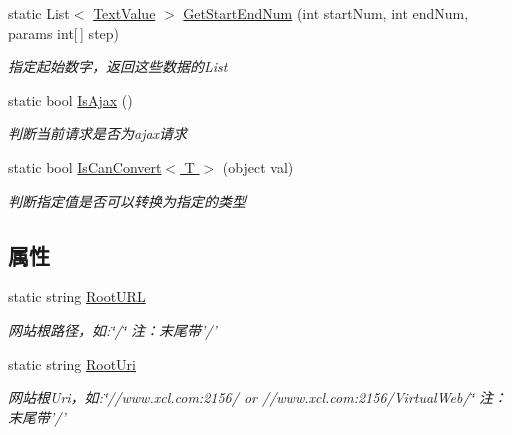 \begin{DoxyCompactItemize}
static List$<$ \hyperlink{class_x_c_l_net_tools_1_1_entity_1_1_text_value}{Text\-Value} $>$ \hyperlink{class_x_c_l_net_tools_1_1_string_hander_1_1_common_a34f200ef899d3b8ff3bff707f86c24d2}{Get\-Start\-End\-Num} (int start\-Num, int end\-Num, params int\mbox{[}$\,$\mbox{]} step)
\begin{DoxyCompactList}\small\item\em 指定起始数字，返回这些数据的\-List \end{DoxyCompactList}\item 
static bool \hyperlink{class_x_c_l_net_tools_1_1_string_hander_1_1_common_a2573b0ab4c60ce76ab6713ed40339db4}{Is\-Ajax} ()
\begin{DoxyCompactList}\small\item\em 判断当前请求是否为ajax请求 \end{DoxyCompactList}\item 
static bool \hyperlink{class_x_c_l_net_tools_1_1_string_hander_1_1_common_a9e27b7aee03f20572b1d66d1df37dbbc}{Is\-Can\-Convert$<$ T $>$} (object val)
\begin{DoxyCompactList}\small\item\em 判断指定值是否可以转换为指定的类型 \end{DoxyCompactList}\end{DoxyCompactItemize}
\subsection*{属性}
\begin{DoxyCompactItemize}
\item 
static string \hyperlink{class_x_c_l_net_tools_1_1_string_hander_1_1_common_a87e9775b7bdaaf9bc205a148b1335ee2}{Root\-U\-R\-L}
\begin{DoxyCompactList}\small\item\em 网站根路径，如\-:\char`\"{}/\char`\"{} 注：末尾带'/' \end{DoxyCompactList}\item 
static string \hyperlink{class_x_c_l_net_tools_1_1_string_hander_1_1_common_ae924e6a3e073efd4a75d53ea7095f976}{Root\-Uri}
\begin{DoxyCompactList}\small\item\em 网站根\-Uri，如\-:\char`\"{}//www.\-xcl.\-com\-:2156/ or //www.\-xcl.\-com\-:2156/\-Virtual\-Web/\char`\"{} 注：末尾带'/' \end{DoxyCompactList}\end{DoxyCompactItemize}


